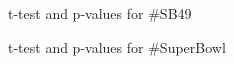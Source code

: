 \documentclass{article}
\begin{document}
\begin{figure}
\centering
{}
\caption{t-test and p-values for \#SB49} \label{Q3_5}
\end{figure}

\begin{figure}
\centering
{}
\caption{t-test and p-values for \#SuperBowl} \label{Q3_6}
\end{figure}
\end{document}
